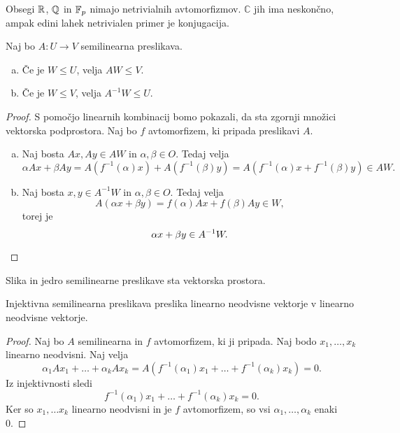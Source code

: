 \begin{opomba}
    Obsegi $\mathbb{R}$, $\mathbb{Q}$ in $\mathbb{F}_p$ nimajo netrivialnih avtomorfizmov. $\mathbb{C}$ jih ima neskončno, ampak edini lahek netrivialen primer je konjugacija.
\end{opomba}


\begin{trditev}
    Naj bo $A \colon U \to V$ semilinearna preslikava.
    
    \begin{enumerate}[a)]
        \item Če je $W \leq U$, velja $AW \leq V$.
        \item Če je $W \leq V$, velja $A^{-1} W \leq U$.
    \end{enumerate}
\end{trditev}

\begin{proof}
    S pomočjo linearnih kombinacij bomo pokazali, da sta zgornji množici vektorska podprostora. Naj bo $f$ avtomorfizem, ki pripada preslikavi $A$.
    \begin{enumerate}[a)]
        \item Naj bosta $Ax,Ay \in AW$ in $\alpha, \beta \in O$. Tedaj velja
        \[
            \alpha Ax + \beta Ay = A(f^{-1}(\alpha) x) + A(f^{-1}(\beta) y) = A(f^{-1}(\alpha) x + f^{-1}(\beta) y) \in AW.
        \]
        
        \item Naj bosta $x,y \in A^{-1}W$ in $\alpha, \beta \in O$. Tedaj velja
        \[
            A(\alpha x + \beta y) = f(\alpha)Ax + f(\beta)Ay \in W,
        \]
        torej je
        \[
        \alpha x + \beta y \in A^{-1}W.   \qedhere
        \]
    \end{enumerate}
\end{proof}

\begin{posledica}
    Slika in jedro semilinearne preslikave sta vektorska prostora.
\end{posledica}

\begin{trditev}
    Injektivna semilinearna preslikava preslika linearno neodvisne vektorje v linearno neodvisne vektorje.
\end{trditev}

\begin{proof}
    Naj bo $A$ semilinearna in $f$ avtomorfizem, ki ji pripada. Naj bodo $x_1, \dots, x_k$ linearno neodvisni. Naj velja
    \[
        \alpha_1 A x_1 + \dots + \alpha_k A x_k = A (f^{-1}(\alpha_1) x_1 + \dots + f^{-1}(\alpha_k) x_k) = 0.
    \]
    Iz injektivnosti sledi
    \[
        f^{-1}(\alpha_1) x_1 + \dots + f^{-1}(\alpha_k) x_k = 0.
    \]
    Ker so $x_1, \dots x_k$ linearno neodvisni in je $f$ avtomorfizem, so vsi $\alpha_1, \dots, \alpha_k$ enaki 0.
\end{proof}

